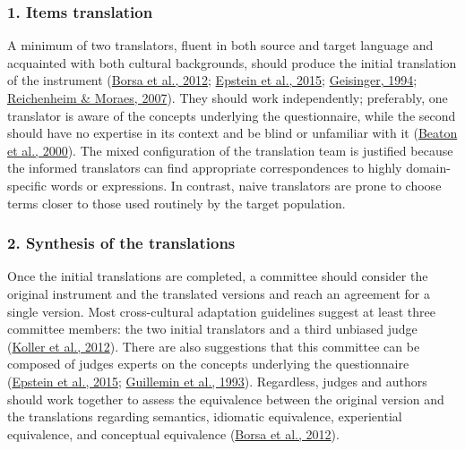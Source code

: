\documentclass[
  ,doc,11pt, twoside,floatsintext]{apa6}
\begin{document}
\hypertarget{items-translation}{%
\subsubsection{1. Items translation}\label{items-translation}}

A minimum of two translators, fluent in both source and target language and acquainted with both cultural backgrounds, should produce the initial translation of the instrument (\protect\hyperlink{ref-borsaAdaptacaoValidacaoInstrumentos2012}{Borsa et al., 2012}; \protect\hyperlink{ref-epstein2015}{Epstein et al., 2015}; \protect\hyperlink{ref-geisinger1994}{Geisinger, 1994}; \protect\hyperlink{ref-reichenheim2007}{Reichenheim \& Moraes, 2007}). They should work independently; preferably, one translator is aware of the concepts underlying the questionnaire, while the second should have no expertise in its context and be blind or unfamiliar with it (\protect\hyperlink{ref-beaton2000}{Beaton et al., 2000}). The mixed configuration of the translation team is justified because the informed translators can find appropriate correspondences to highly domain-specific words or expressions. In contrast, naive translators are prone to choose terms closer to those used routinely by the target population.

\hypertarget{synthesis-of-the-translations}{%
\subsubsection{2. Synthesis of the translations}\label{synthesis-of-the-translations}}

Once the initial translations are completed, a committee should consider the original instrument and the translated versions and reach an agreement for a single version. Most cross-cultural adaptation guidelines suggest at least three committee members: the two initial translators and a third unbiased judge (\protect\hyperlink{ref-koller2012}{Koller et al., 2012}). There are also suggestions that this committee can be composed of judges experts on the concepts underlying the questionnaire (\protect\hyperlink{ref-epstein2015}{Epstein et al., 2015}; \protect\hyperlink{ref-guillemin1993}{Guillemin et al., 1993}). Regardless, judges and authors should work together to assess the equivalence between the original version and the translations regarding semantics, idiomatic equivalence, experiential equivalence, and conceptual equivalence (\protect\hyperlink{ref-borsaAdaptacaoValidacaoInstrumentos2012}{Borsa et al., 2012}).
\end{document}

